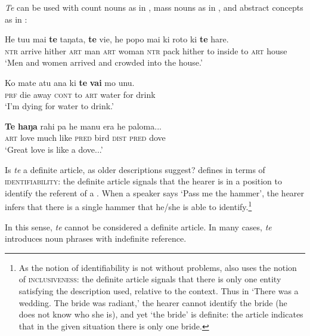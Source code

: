 \textit{Te} can be used with count nouns as in , mass nouns as in , and abstract concepts as in :

\ea\label{ex:5.28}
\gll He tu{\ꞌ}u mai \textbf{te} taŋata, \textbf{te} vi{\ꞌ}e, he popo mai ki roto ki \textbf{te} hare.\\
\textsc{ntr} arrive hither \textsc{art} man \textsc{art} woman \textsc{ntr} pack hither to inside to \textsc{art} house\\

\glt 
‘Men and women arrived and crowded into the house.’ \textstyleExampleref{[Ley-5-34.009]}
\z

\ea\label{ex:5.29}
\gll Ko mate atu {\ꞌ}ana ki \textbf{te} \textbf{vai} mo unu.\\
\textsc{prf} die away \textsc{cont} to \textsc{art} water for drink\\

\glt 
‘I’m dying for water to drink.’ \textstyleExampleref{[R303.032]} 
\z

\ea\label{ex:5.30}
\gll \textbf{Te} \textbf{haŋa} rahi pa he manu era he paloma...\\
\textsc{art} love much like \textsc{pred} bird \textsc{dist} \textsc{pred} dove\\

\glt
‘Great love is like a dove...’ \textstyleExampleref{[R222.036–037]}
\z

Is \textit{te} a definite article, as older descriptions suggest? \citet{Lyons1999} defines  in terms of \textsc{identifiability}: the definite article signals that the hearer is in a position to identify the referent of a . When a speaker says ‘Pass me the hammer’, the hearer infers that there is a single hammer that he/she is able to identify.\footnote{\label{fn:251}As the notion of identifiability is not without problems, \citet{Lyons1999} also uses the notion of \textsc{inclusiveness}: the definite article signals that there is only one entity satisfying the description used, relative to the context. Thus in ‘There was a wedding. The bride was radiant,’ the hearer cannot identify the bride (he does not know who she is), and yet ‘the bride’ is definite: the article indicates that in the given situation there is only one bride.}

In this sense, \textit{te} cannot be considered a definite article. In many cases, \textit{te} introduces noun phrases with indefinite reference.

